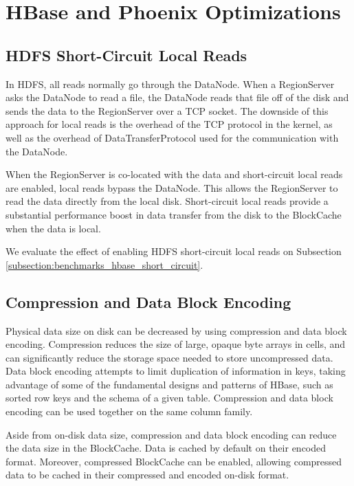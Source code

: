 \chapter{HBase and Phoenix Optimizations}

\section{HDFS Short-Circuit Local Reads}\label{section:optimizations_short_circuit}

In HDFS, all reads normally go through the DataNode. When a RegionServer asks the DataNode to read a file, the DataNode reads that file off of the disk and sends the data to the RegionServer over a TCP socket. The downside of this approach for local reads is the overhead of the TCP protocol in the kernel, as well as the overhead of DataTransferProtocol used for the communication with the DataNode.

When the RegionServer is co-located with the data and short-circuit local reads are enabled, local reads bypass the DataNode. This allows the RegionServer to read the data directly from the local disk. Short-circuit local reads provide a substantial performance boost in data transfer from the disk to the BlockCache when the data is local.

We evaluate the effect of enabling HDFS short-circuit local reads on Subsection \ref{subsection:benchmarks_hbase_short_circuit}.


\section{Compression and Data Block Encoding}\label{section:compression_encoding}

Physical data size on disk can be decreased by using compression and data block encoding. Compression reduces the size of large, opaque byte arrays in cells, and can significantly reduce the storage space needed to store uncompressed data. Data block encoding attempts to limit duplication of information in keys, taking advantage of some of the fundamental designs and patterns of HBase, such as sorted row keys and the schema of a given table. Compression and data block encoding can be used together on the same column family.

Aside from on-disk data size, compression and data block encoding can reduce the data size in the BlockCache. Data is cached by default on their encoded format. Moreover, compressed BlockCache can be enabled, allowing compressed data to be cached in their compressed and encoded on-disk format.

